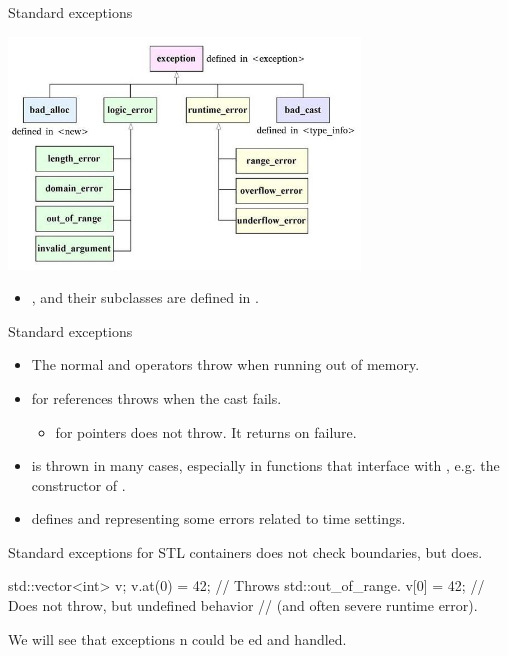 \documentclass[aspectratio=169]{beamer}
\begin{document}
\begin{frame}{Standard exceptions}
  \begin{center}
    \includegraphics[width=0.7\textwidth]{img/ExceptionClasses.jpg}
  \end{center}
  \begin{itemize}
    \item {},  and their subclasses are defined in .
  \end{itemize}
\end{frame}

\begin{frame}{Standard exceptions}
  \begin{itemize}
    \item The normal  and  operators throw  when running out of memory.
    \item {} for references throws  when the cast fails.
    \begin{itemize}
        \item {} for pointers does not throw. It returns  on failure.
    \end{itemize}
    \pause
    \item {} is thrown in many cases, especially in functions that interface with , e.g. the constructor of .
    \item {} defines  and  representing some errors related to time settings.
  \end{itemize}
\end{frame}

\begin{frame}[fragile]{Standard exceptions}
   for STL containers does not check boundaries, but  does.
  \begin{cpp}
    std::vector<int> v;
    v.at(0) = 42; // Throws std::out_of_range.
    v[0] = 42;    // Does not throw, but undefined behavior
                  // (and often severe runtime error).
  \end{cpp}
  We will see that exceptions n could be ed and handled.
\end{frame}
\end{document}
